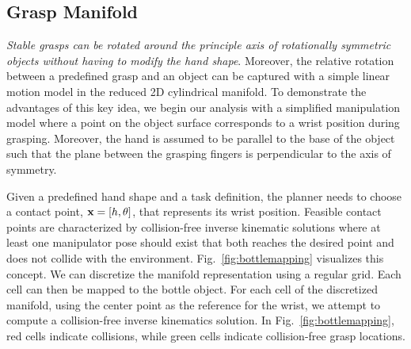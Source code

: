\documentclass[a4paper,10pt,twocolumn]{article}
\begin{document}
\subsection{Grasp Manifold}

\textit{Stable grasps can be rotated around the principle axis of rotationally symmetric objects
without having to modify the hand shape}. Moreover, the relative rotation between a predefined grasp
and an object can be captured with a simple linear motion model in the reduced 2D cylindrical
manifold. To demonstrate the advantages of this key idea, we begin our analysis with a simplified
manipulation model where a point on the object surface corresponds to a wrist position during
grasping. Moreover, the hand is assumed to be parallel to the base of the object such that the plane
between the grasping fingers is perpendicular to the axis of symmetry. 

Given a predefined hand shape and a task definition, the planner needs to choose a contact point,
$\textbf{x} = [h, \theta]$, that represents its wrist position. Feasible contact points are characterized
by collision-free inverse kinematic solutions where at least one manipulator pose should exist that both reaches the desired point and does not collide with the environment. Fig.~\ref{fig:bottlemapping} visualizes this concept. We can discretize the manifold representation using a regular grid. Each cell can then be mapped to the bottle object. For each cell of the
discretized manifold, using the center point  as the reference for the wrist, we attempt to compute a collision-free inverse kinematics solution. In Fig.~\ref{fig:bottlemapping}, red cells indicate collisions, while green cells indicate collision-free grasp locations. 
\end{document}
